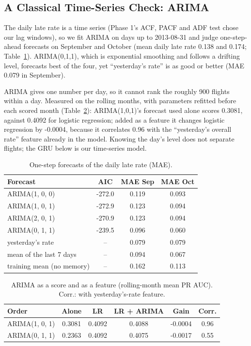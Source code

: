 \documentclass[conference]{IEEEtran}
\begin{document}
\subsection{A Classical Time-Series Check: ARIMA}
The daily late rate is a time series (Phase 1's ACF, PACF and ADF test chose our lag windows), so we fit ARIMA \cite{box2015} on days up to 2013-08-31 and judge one-step-ahead forecasts on September and October (mean daily late rate 0.138 and 0.174; Table~\ref{tab:arima}). ARIMA(0,1,1), which is exponential smoothing and follows a drifting level, forecasts best of the four, yet ``yesterday's rate'' is as good or better (MAE 0.079 in September).

ARIMA gives one number per day, so it cannot rank the roughly 900 flights within a day. Measured on the rolling months, with parameters refitted before each scored month (Table~\ref{tab:arimarank}): ARIMA(1,0,1)'s forecast used alone scores 0.3081, against 0.4092 for logistic regression; added as a feature it changes logistic regression by -0.0004, because it correlates 0.96 with the ``yesterday's overall rate'' feature already in the model. Knowing the day's level does not separate flights; the GRU below is our time-series model.

\begin{table}[t]\centering\caption{One-step forecasts of the daily late rate (MAE).}\label{tab:arima}
\footnotesize\begin{tabular}{lccc}\toprule
Forecast & AIC & MAE Sep & MAE Oct\\\midrule
ARIMA(1, 0, 0) & -272.0 & 0.119 & 0.093\\
ARIMA(1, 0, 1) & -272.9 & 0.123 & 0.094\\
ARIMA(2, 0, 1) & -270.9 & 0.123 & 0.094\\
ARIMA(0, 1, 1) & -239.5 & 0.096 & 0.060\\
yesterday's rate & -- & 0.079 & 0.079\\
mean of the last 7 days & -- & 0.094 & 0.067\\
training mean (no memory) & -- & 0.162 & 0.113\\
\bottomrule\end{tabular}\end{table}

\begin{table}[t]\centering\caption{ARIMA as a score and as a feature (rolling-month mean PR AUC). Corr.: with yesterday's-rate feature.}\label{tab:arimarank}
\setlength{\tabcolsep}{3pt}\footnotesize\begin{tabular}{lccccc}\toprule
Order & Alone & LR & LR + ARIMA & Gain & Corr.\\\midrule
ARIMA(1, 0, 1) & 0.3081 & 0.4092 & 0.4088 & -0.0004 & 0.96\\
ARIMA(0, 1, 1) & 0.2363 & 0.4092 & 0.4075 & -0.0017 & 0.55\\
\bottomrule\end{tabular}\end{table}
\end{document}
